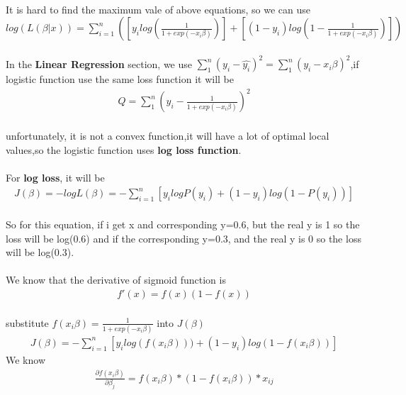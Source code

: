 \documentclass[a4paper,12pt]{article}
\begin{document}
\begin{spacing}{2}
\paragraph{ }It is hard to find the maximum vale of above equations, so we can use $log(L(\beta|x))=\sum_{i=1}^{n}([y_{i}log(\frac{1}{1+exp(-x_{i}\beta)})]+[(1-y_{i})log(1-\frac{1}{1+exp(-x_{i}\beta)})])$
\paragraph{ }In the \textbf{Linear Regression} section, we use $\sum_{1}^{n}(y_{i}-\hat{y_{i}})^{2}=\sum_{1}^{n}(y_{i}-x_{i}\beta)^{2}$,if logistic function use the same loss function it will be 
\begin{align}
Q=\sum_{1}^{n}(y_{i}-\frac{1}{1+exp(-x_{i}\beta)})^{2}
\end{align} 
\paragraph{ }unfortunately, it is not a convex function,it will have a lot of optimal local values,so the logistic function uses \textbf{log loss function}.
\paragraph{ }For \textbf{log loss}, it will be 
\begin{align}
J(\beta)=-logL(\beta)=-\sum_{i=1}^{n}[y_{i}logP(y_{i})+(1-y_{i})log(1-P(y_{i}))]
\end{align}
\paragraph{ }So for this equation, if i get x and corresponding y=0.6, but the real y is 1 so the loss will be log(0.6) and if the corresponding y=0.3, and the real y is 0 so the loss will be log(0.3).

\paragraph{ }We know that the derivative of sigmoid function is 
\begin{align}
f'(x)=f(x)(1-f(x))
\end{align}
\paragraph{ }substitute $f(x_{i}\beta)=\frac{1}{1+exp(-x_{i}\beta)}$ into $J(\beta)$
\begin{align}
J(\beta)=-\sum_{i=1}^{n}[y_{i}log(f(x_{i}\beta)))+(1-y_{i})log(1-f(x_{i}\beta))]
\end{align}
We know 
\begin{align}
\frac{\partial f(x_{i}\beta)}{\partial\beta_{j}}=f(x_{i}\beta)*(1-f(x_{i}\beta))*x_{ij}
\end{align}

\end{spacing}
\end{document}
